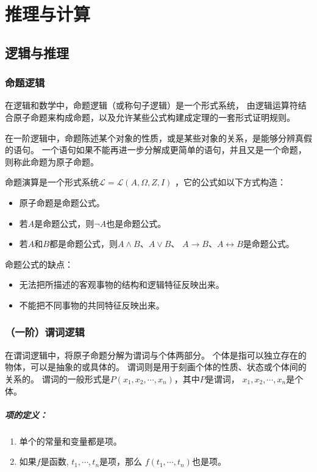 \chapter{推理与计算}

\section{逻辑与推理}
\def\PLang{\mathcal{L}}
\subsection{命题逻辑}
在逻辑和数学中，命题逻辑（或称句子逻辑）是一个形式系统，
由逻辑运算符结合原子命题来构成命题，以及允许某些公式构建成定理的一套形式证明规则。

在一阶逻辑中，命题陈述某个对象的性质，或是某些对象的关系，是能够分辨真假的语句。
一个语句如果不能再进一步分解成更简单的语句，并且又是一个命题，则称此命题为原子命题。

命题演算是一个形式系统$\PLang = \PLang(A, \Omega, Z, I)$
，它的公式如以下方式构造：
\begin{itemize}
        \item 原子命题是命题公式。
        \item 若$A$是命题公式，则$\lnot A$也是命题公式。
        \item 若$A$和$B$都是命题公式，则$A \land B$、$A \lor B$、
        $A \rightarrow B$、$A \leftrightarrow B$是命题公式。
\end{itemize}
命题公式的缺点：
\begin{itemize}
        \item 无法把所描述的客观事物的结构和逻辑特征反映出来。
        \item 不能把不同事物的共同特征反映出来。
\end{itemize}

\subsection{（一阶）谓词逻辑}
在谓词逻辑中，将原子命题分解为谓词与个体两部分。
个体是指可以独立存在的物体，可以是抽象的或具体的。
谓词则是用于刻画个体的性质、状态或个体间的关系的。 
谓词的一般形式是$P(x_1, x_2, \cdots, x_n)$，其中$P$是谓词，
$x_1,x_2,\cdots,x_n$是个体。

\paragraph{项的定义：}
\begin{enumerate}
        \item 单个的常量和变量都是项。
        \item 如果$f$是函数, $t_1, \cdots, t_n$是项，那么   
                $f(t_1, \cdots, t_n)$也是项。
\end{enumerate}

